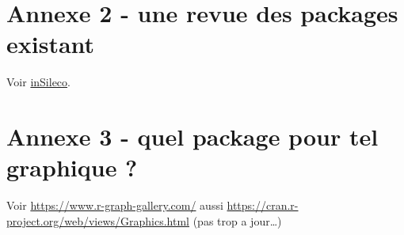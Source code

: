 \documentclass[]{article}
\begin{document}
\hypertarget{annexe-2---une-revue-des-packages-existant}{%
\section*{Annexe 2 - une revue des packages existant}\label{annexe-2---une-revue-des-packages-existant}}

Voir \href{https://insileco.github.io/wiki/rgraphpkgs/}{inSileco}.

\hypertarget{annexe-3---quel-package-pour-tel-graphique}{%
\section{Annexe 3 - quel package pour tel graphique ?}\label{annexe-3---quel-package-pour-tel-graphique}}

Voir \url{https://www.r-graph-gallery.com/}
aussi \url{https://cran.r-project.org/web/views/Graphics.html} (pas trop a jour\ldots{})


\end{document}
